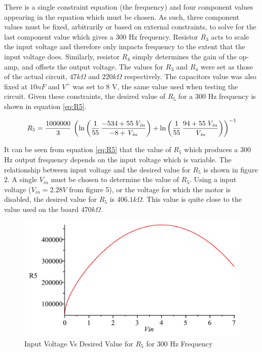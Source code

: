 There is a single constraint equation (the frequency) and four component values appearing in the equation which must be chosen.
As such, three component values must be fixed, arbitrarily or based on external constraints, to solve for the last component value which gives a 300 Hz frequency.
%
Resistor $R_3$ acts to scale the input voltage and therefore only impacts frequency to the extent that the input voltage does.
Similarly, resistor $R_4$ simply determines the gain of the op-amp, and offsets the output voltage. 
The values for $R_3$ and $R_4$ were set as those of the actual circuit, $47 k\Omega$ and $220 k\Omega$ respectively.
The capacitors value was also fixed at $10 nF$ and $V^{+}$ was set to 8 V, the same value used when testing the circuit.
Given these constraints, the desired value of $R_5$ for a 300 Hz frequency is shown in equation \ref{eq:R5}.

\begin{equation}
	\label{eq:R5}
	R_5 = {\frac {1000000}{3}}\, \left( \ln  \left( {\frac {1}{55}}\,{\frac {-
534+55\,{\it V_{in}}}{-8+{\it V_{in}}}} \right) +\ln  \left( {\frac {1}{55}}\,
{\frac {94+55\,{\it V_{in}}}{{\it V_{in}}}} \right)  \right) ^{-1}
\end{equation}

It can be seen from equation \ref{eq:R5} that the value of $R_5$ which produces a 300 Hz output frequency depends on the input voltage which is variable.
The relationship between input voltage and the desired value for $R_5$ is shown in figure 2.
A single $V_{in}$ must be chosen to determine the value of $R_5$. 
Using a  input voltage ($V_{in} = 2.28 V$ from figure 5), or the voltage for which the motor is disabled, the desired value for $R_5$ is  $406.1 k\Omega$.
This value is quite close to the value used on the board $470 k\Omega$.

\begin{figure}[h]
    \label{fig:VinR5}
    \centering
    \includegraphics[width=.70\textwidth]{images/VinR5.pdf}
    \caption{Input Voltage Vs Desired Value for $R_5$ for 300 Hz Frequency}
\end{figure}


